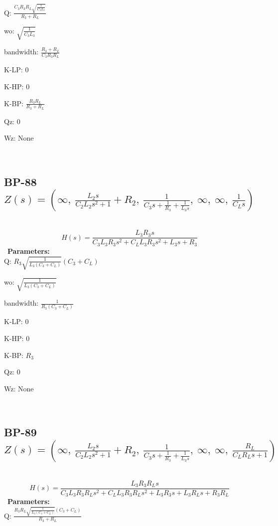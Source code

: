 \documentclass{article}
\begin{document}
Q: $\frac{C_{3} R_{3} R_{L} \sqrt{\frac{1}{C_{3} L_{3}}}}{R_{3} + R_{L}}$\ 

wo: $\sqrt{\frac{1}{C_{3} L_{3}}}$\ 

bandwidth: $\frac{R_{3} + R_{L}}{C_{3} R_{3} R_{L}}$\ 

K-LP: $0$\ 

K-HP: $0$\ 

K-BP: $\frac{R_{3} R_{L}}{R_{3} + R_{L}}$\ 

Qz: $0$\ 

Wz: $\text{None}$\ 

\ 

\subsection{BP-88 $Z(s) = \left( \infty, \  \frac{L_{2} s}{C_{2} L_{2} s^{2} + 1} + R_{2}, \  \frac{1}{C_{3} s + \frac{1}{R_{3}} + \frac{1}{L_{3} s}}, \  \infty, \  \infty, \  \frac{1}{C_{L} s}\right)$ } \ 
\textbf{\[H(s) = \frac{L_{3} R_{3} s}{C_{3} L_{3} R_{3} s^{2} + C_{L} L_{3} R_{3} s^{2} + L_{3} s + R_{3}}\] } \ 
\textbf{Parameters:}\\ 

Q: $R_{3} \sqrt{\frac{1}{L_{3} \left(C_{3} + C_{L}\right)}} \left(C_{3} + C_{L}\right)$\ 

wo: $\sqrt{\frac{1}{L_{3} \left(C_{3} + C_{L}\right)}}$\ 

bandwidth: $\frac{1}{R_{3} \left(C_{3} + C_{L}\right)}$\ 

K-LP: $0$\ 

K-HP: $0$\ 

K-BP: $R_{3}$\ 

Qz: $0$\ 

Wz: $\text{None}$\ 

\ 

\subsection{BP-89 $Z(s) = \left( \infty, \  \frac{L_{2} s}{C_{2} L_{2} s^{2} + 1} + R_{2}, \  \frac{1}{C_{3} s + \frac{1}{R_{3}} + \frac{1}{L_{3} s}}, \  \infty, \  \infty, \  \frac{R_{L}}{C_{L} R_{L} s + 1}\right)$ } \ 
\textbf{\[H(s) = \frac{L_{3} R_{3} R_{L} s}{C_{3} L_{3} R_{3} R_{L} s^{2} + C_{L} L_{3} R_{3} R_{L} s^{2} + L_{3} R_{3} s + L_{3} R_{L} s + R_{3} R_{L}}\] } \ 
\textbf{Parameters:}\\ 

Q: $\frac{R_{3} R_{L} \sqrt{\frac{1}{L_{3} \left(C_{3} + C_{L}\right)}} \left(C_{3} + C_{L}\right)}{R_{3} + R_{L}}$\ 
\end{document}
